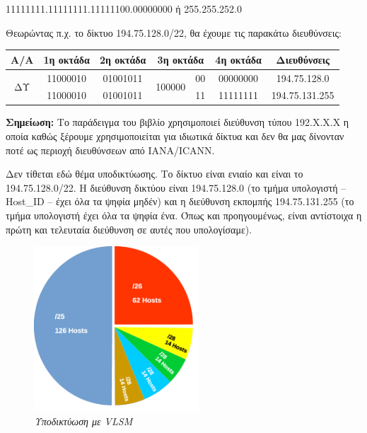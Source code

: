 11111111.11111111.11111100.00000000 ή 255.255.252.0

Θεωρώντας π.χ. το δίκτυο 194.75.128.0/22, θα έχουμε τις παρακάτω διευθύνσεις:

\begin{center}
\fontsize{10}{12}
\ttfamily
\begin{tabular}{|c|c|c|c|c|c|c|}
\hline
    Α/Α              & 1η οκτάδα & 2η οκτάδα & \multicolumn{2}{c|}{3η οκτάδα} & 4η οκτάδα & Διευθύνσεις \\ \hline
\multirow{2}{*}{ΔΥ} & 11000010  & 01001011 & \multirow{2}{*}{100000}  & 00 & 00000000 & 194.75.128.0 \\ \cline{2-3} \cline{5-7} 
                  & 11000010 & 01001011 &                    & 11 & 11111111 & 194.75.131.255 \\ \hline
\end{tabular}
\normalfont
\end{center}

\begin{inthebox}
\textbf{Σημείωση:} Το παράδειγμα του βιβλίο χρησιμοποιεί διεύθυνση τύπου 192.Χ.Χ.Χ η οποία καθώς ξέρουμε χρησιμοποιείται για ιδιωτικά δίκτυα και δεν θα μας δίνονταν ποτέ ως περιοχή διευθύνσεων από IANA/ICANN.\\
\end{inthebox}
 
Δεν τίθεται εδώ θέμα υποδικτύωσης. Το δίκτυο είναι ενιαίο και είναι το 194.75.128.0/22. Η διεύθυνση δικτύου είναι 194.75.128.0 (το τμήμα υπολογιστή -- Host\_ID -- έχει όλα τα ψηφία μηδέν) και η διεύθυνση εκπομπής 194.75.131.255 (το τμήμα υπολογιστή έχει όλα τα ψηφία ένα. Όπως και προηγουμένως, είναι αντίστοιχα η πρώτη και τελευταία διεύθυνση σε αυτές που υπολογίσαμε). 

\begin{figure}[!ht]
  \centering
  \includegraphics[width=0.55\textwidth]{images/chapter3/3-4}
  \caption {\textsl{Υποδικτύωση με VLSM}}
  \label{3-4}
\end{figure}


